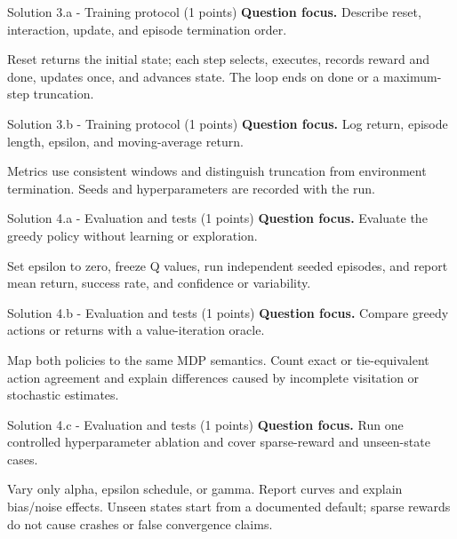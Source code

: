 \documentclass[aspectratio=169,11pt]{beamer}
\begin{document}
\begin{frame}{Solution 3.a - Training protocol (1 points)}
\small
\textbf{Question focus.} Describe reset, interaction, update, and episode termination order.

\vspace{0.25cm}
\answerlabel Reset returns the initial state; each step selects, executes, records reward and done, updates once, and advances state. The loop ends on done or a maximum-step truncation.
\end{frame}

\begin{frame}{Solution 3.b - Training protocol (1 points)}
\small
\textbf{Question focus.} Log return, episode length, epsilon, and moving-average return.

\vspace{0.25cm}
\answerlabel Metrics use consistent windows and distinguish truncation from environment termination. Seeds and hyperparameters are recorded with the run.
\end{frame}

\begin{frame}{Solution 4.a - Evaluation and tests (1 points)}
\small
\textbf{Question focus.} Evaluate the greedy policy without learning or exploration.

\vspace{0.25cm}
\answerlabel Set epsilon to zero, freeze Q values, run independent seeded episodes, and report mean return, success rate, and confidence or variability.
\end{frame}

\begin{frame}{Solution 4.b - Evaluation and tests (1 points)}
\small
\textbf{Question focus.} Compare greedy actions or returns with a value-iteration oracle.

\vspace{0.25cm}
\answerlabel Map both policies to the same MDP semantics. Count exact or tie-equivalent action agreement and explain differences caused by incomplete visitation or stochastic estimates.
\end{frame}

\begin{frame}{Solution 4.c - Evaluation and tests (1 points)}
\small
\textbf{Question focus.} Run one controlled hyperparameter ablation and cover sparse-reward and unseen-state cases.

\vspace{0.25cm}
\answerlabel Vary only alpha, epsilon schedule, or gamma. Report curves and explain bias/noise effects. Unseen states start from a documented default; sparse rewards do not cause crashes or false convergence claims.
\end{frame}
\end{document}
